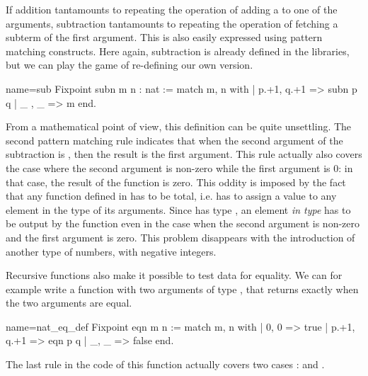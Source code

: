 %
%
If addition tantamounts to repeating the operation of adding a 
to one of the arguments, subtraction tantamounts to repeating the
operation of fetching a subterm of the first argument.  This is also
easily expressed using pattern matching constructs.  Here again,
subtraction is already defined in the libraries, but we can play the game
of re-defining our own version.

\begin{coq}{name=sub}{}
Fixpoint subn m n : nat :=
  match m, n with
  | p.+1, q.+1 => subn p q
  | _ , _ => m
  end.
\end{coq}
From a mathematical point of view, this definition can be quite
unsettling.  The second pattern matching rule indicates that when
the second argument of the subtraction is , then the result is
the first argument.  This rule actually also covers the case where the
second argument is non-zero while the first argument is 0: in that
case, the result of the function is zero. This oddity is imposed by
the fact that any function defined in \Coq{} has to be total, i.e. has
to assign a value to any element in the type of its arguments. Since
 has type , an element \emph{in type}  has to be
output by the function even in the case when  the second argument is
non-zero and the first argument is zero. This problem disappears with
the introduction of another type of numbers, with negative integers.

Recursive functions also make it possible to test data for
equality. We can for example write a function with two arguments of
type , that
returns  exactly when the two arguments are equal.


\begin{coq}{name=nat_eq_def}{}
Fixpoint eqn m n :=
  match m, n with
  | 0, 0 => true
  | p.+1, q.+1 => eqn p q
  | _, _ => false
  end.
\end{coq}
The last rule in the code of this function actually covers two cases :
 and .

